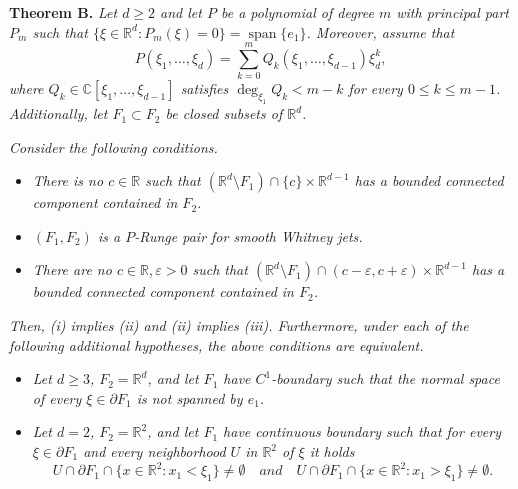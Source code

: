 \documentclass[10pt,leqno]{amsart}
\theoremstyle{definition}
\newcommand{\R}{\mathbb R}
\newcommand{\C}{\mathbb C}
\begin{document}
\textbf{Theorem B.}\label{thm B} \textit{Let $d\geq 2$ and let $P$ be a polynomial of degree $m$ with principal part $P_m$ such that $\{\xi\in\R^d: P_m(\xi)=0\}=\operatorname{span}\{e_1\}$. Moreover, assume that
	$$P(\xi_1,\ldots,\xi_d)=\sum_{k=0}^mQ_k(\xi_1,\ldots,\xi_{d-1})\xi_d^k,$$
	where $Q_k\in\C[\xi_1,\ldots,\xi_{d-1}]$ satisfies $\operatorname{deg}_{\xi_1}Q_k< m-k$ for every $0\leq k\leq m-1$. Additionally, let $F_1\subset F_2$ be closed subsets of $\R^d$.}

	\textit{Consider the following conditions.}
	\begin{itemize}
		\item[(i)] \textit{There is no $c\in\R$ such that $(\R^d\setminus F_1)\cap \{c\}\times\R^{d-1}$ has a bounded connected component contained in $F_2$.}
		\item[(ii)] \textit{$(F_1, F_2)$ is a $P$-Runge pair for smooth Whitney jets.}
		\item[(iii)] \textit{There are no $c\in\R, \varepsilon>0$ such that $(\R^d\setminus F_1)\cap (c-\varepsilon,c+\varepsilon)\times\R^{d-1}$ has a bounded connected component contained in $F_2$.}
	\end{itemize}
	\textit{Then, (i) implies (ii) and (ii) implies (iii). Furthermore, under each of the following additional hypotheses, the above conditions are equivalent.}
	\begin{itemize}
		\item[(a)] \textit{Let $d\geq 3$, $F_2=\R^d$, and let $F_1$ have $C^1$-boundary such that the normal space of every $\xi\in\partial F_1$ is not spanned by $e_1$.}
		\item[(b)] \textit{Let $d=2$, $F_2=\R^2$, and let $F_1$ have continuous boundary such that for every $\xi\in\partial F_1$ and every neighborhood $U$ in $\R^2$ of $\xi$ it holds}
		$$U\cap \partial F_1\cap\{x\in \R^2: x_1 <\xi_1\}\neq \emptyset \quad\textit{and}\quad U\cap \partial F_1\cap\{x\in \R^2: x_1 >\xi_1\}\neq \emptyset.$$
	\end{itemize}
\end{document}

